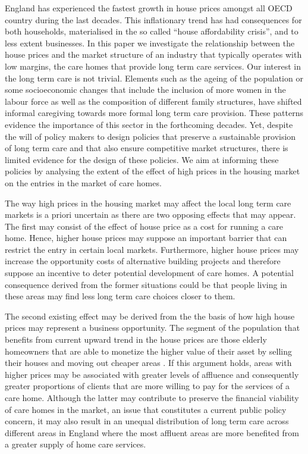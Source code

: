 \documentclass[12pt,letterpaper]{article}
\begin{document}
England has experienced the fastest growth in house prices amongst all OECD country during the last decades.
This inflationary trend has had consequences for both households, materialised in the so called “house affordability crisis”, 
and to less extent businesses. In this paper we investigate the relationship between the house prices 
and the market structure of an industry that typically operates with low margins, the care homes 
that provide long term care services. Our interest in the long term care is not trivial. Elements such as 
the ageing of the population or some socioeconomic changes that include the inclusion of more women 
in the labour force as well as the composition of different family structures, have shifted informal caregiving 
towards more formal long term care provision. These patterns evidence the importance of this sector in the 
forthcoming decades. Yet, despite the will of policy makers to design policies that preserve a sustainable 
provision of long term care and that also ensure competitive market structures, there is limited evidence for
 the design of these policies.  We aim at informing these policies by analysing the extent of the effect of high 
 prices in the housing market on the entries in the market of care homes. 

The way high prices in the housing market may affect the local long term care markets is a priori uncertain 
as there are two opposing effects that may appear. The first may consist of the effect of house price 
as a cost for running a care home. Hence, higher house prices may suppose an important barrier that can restrict the
 entry in certain local markets. Furthermore, higher house prices may increase the opportunity costs of alternative
 building projects and therefore suppose an incentive to deter potential development of care homes. 
 A potential consequence derived from the former situations could be that people living in
  these areas may find less long term care choices closer to them. 
  
  The second existing effect may be derived from the the basis of how high house prices may represent
   a business opportunity. The segment of the population that benefits from current upward trend in the house
    prices are those elderly homeowners that are able to monetize the higher value of their asset by selling their
     houses and moving out cheaper areas \citep{hilber2016housingpolicies}. If this argument holds, areas with higher 
     prices may be associated with greater levels of affluence and consequently greater proportions of clients
      that are more willing to pay for the services of a care home. Although the latter may contribute to preserve 
      the financial viability of care homes in the market, an issue that constitutes a current public policy concern, 
      it may also result in an unequal distribution of long term care across different areas in England where the
       most affluent areas are more benefited from a greater supply of home care services. 
\end{document}
